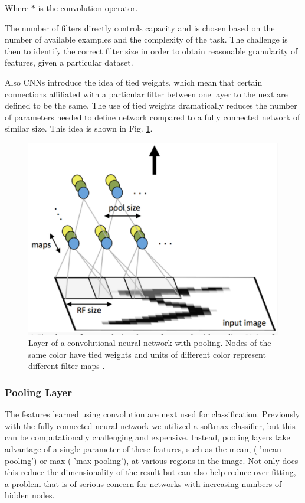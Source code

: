\documentclass[12pt, twocolumn]{article}
\begin{document}
 Where $\ast$ is the convolution operator. 
 
 The number of filters directly controls capacity and is chosen based on the number of available examples and the complexity of the task. The challenge is then to identify the correct filter size in order to obtain reasonable granularity of features, given a particular dataset.

Also CNNs introduce the idea of tied weights, which mean that certain connections affiliated with a particular filter between one layer to the next are defined to be the same. The use of tied weights dramatically reduces the number of parameters needed to define network compared to a fully connected network of similar size. This idea is shown in Fig. \ref{fig:conv}.



\begin{figure}
\includegraphics[scale=.4]{convgraphic.png}

\caption{Layer of a convolutional neural network with pooling. Nodes of the same color have tied weights and units of different color represent different filter maps \cite{StanfordTut}. }
\label{fig:conv}
\end{figure}


\subsubsection{Pooling Layer}
The features learned using convolution are next used for classification. Previously with the fully connected neural network we utilized a softmax classifier, but this can be computationally challenging and expensive. Instead, pooling layers take advantage of a single parameter of these features, such as the mean, ( 'mean pooling') or max ( 'max pooling'), at  various regions in the image. Not only does this reduce the dimensionality of the result but can also help reduce over-fitting, a problem that is of serious concern for networks with increasing numbers of hidden nodes. 
\end{document}
